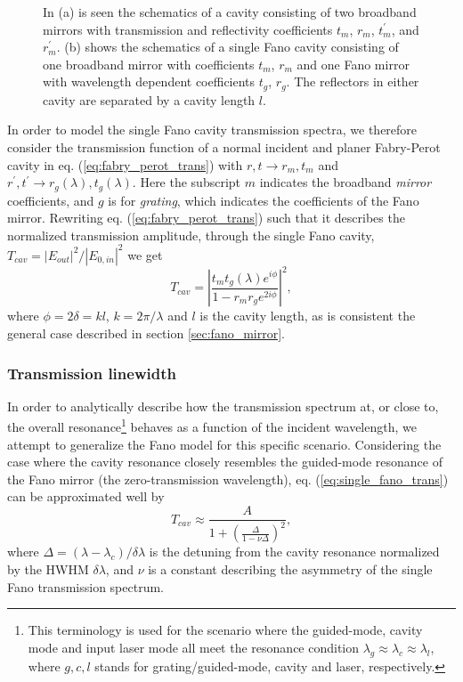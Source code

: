 \begin{figure}[h!]
\begin{subfigure}[b]{0.3\textwidth}
        \caption{}
        \label{fig:single_fano_sketch}
    \end{subfigure}
    \caption{In (a) is seen the schematics of a cavity consisting of two broadband mirrors with transmission and reflectivity coefficients $t_m$, $r_m$, $t_m^{\prime}$, and $r_m^{\prime}$. (b) shows the schematics of a single Fano cavity consisting of one broadband mirror with coefficients $t_m$, $r_m$ and one Fano mirror with wavelength dependent coefficients $t_g$, $r_g$. The reflectors in either cavity are separated by a cavity length $l$.}
    \label{fig:broadband_and_single_fano_sketch}
\end{figure}

In order to model the single Fano cavity transmission spectra, we therefore consider the transmission function of a normal incident and planer Fabry-Perot cavity in eq. (\ref{eq:fabry_perot_trans}) with $r,t \rightarrow r_m,t_m$ and $r^{\prime},t^{\prime} \rightarrow r_g(\lambda),t_g(\lambda)$. Here the subscript $m$ indicates the broadband \emph{mirror} coefficients, and $g$ is for \emph{grating}, which indicates the coefficients of the Fano mirror. Rewriting eq. (\ref{eq:fabry_perot_trans}) such that it describes the normalized transmission amplitude, through the single Fano cavity, $T_{cav} = |E_{out}|^2/|E_{0,in}|^2$ we get
\begin{equation}
    T_{cav} = \left|\frac{t_m t_g(\lambda) e^{i\phi}}{1 - r_m r_g e^{2i\phi}}\right|^2,
    \label{eq:single_fano_trans}
\end{equation}
where $\phi = 2\delta = kl$, $k=2 \pi / \lambda$ and $l$ is the cavity length, as is consistent the general case described in section \ref{sec:fano_mirror}.

\subsubsection{Transmission linewidth}\label{sec:single_fano_cavity_trans_linewidth}

In order to analytically describe how the transmission spectrum at, or close to, the overall resonance\footnote{This terminology is used for the scenario where the guided-mode, cavity mode and input laser mode all meet the resonance condition $\lambda_g \approx \lambda_c \approx \lambda_l$, where $g,c,l$ stands for grating/guided-mode, cavity and laser, respectively.} behaves as a function of the incident wavelength, we attempt to generalize the Fano model for this specific scenario. Considering the case where the cavity resonance closely resembles the guided-mode resonance of the Fano mirror (the zero-transmission wavelength), eq. (\ref{eq:single_fano_trans}) can be approximated well by
\begin{equation}
    T_{cav} \approx \frac{A}{1 + \left( \frac{\Delta}{1 - \nu \Delta} \right)^2},
    \label{eq:general_fano_model}
\end{equation}
where $\Delta = (\lambda - \lambda_c) / \delta \lambda$ is the detuning from the cavity resonance normalized by the HWHM $\delta \lambda$, and $\nu$ is a constant describing the asymmetry of the single Fano transmission spectrum. 

